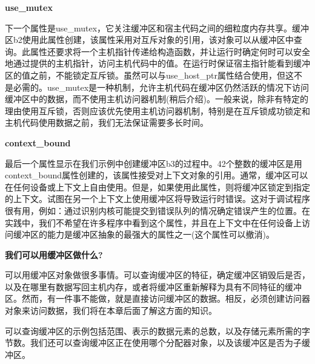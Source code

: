 \hspace*{\fill} \par %
\textbf{use\_mutex}

下一个属性是use\_mutex，它关注缓冲区和宿主代码之间的细粒度内存共享。缓冲区b2使用此属性创建，该属性采用对互斥对象的引用，该对象可以从缓冲区中查询。此属性还要求将一个主机指针传递给构造函数，并让运行时确定何时可以安全地通过提供的主机指针，访问主机代码中的值。在运行时保证宿主指针能看到缓冲区的值之前，不能锁定互斥锁。虽然可以与use\_host\_ptr属性结合使用，但这不是必需的。use\_mutex是一种机制，允许主机代码在缓冲区仍然活跃的情况下访问缓冲区中的数据，而不使用主机访问器机制(稍后介绍)。一般来说，除非有特定的理由使用互斥锁，否则应该优先使用主机访问器机制，特别是在互斥锁成功锁定和主机代码使用数据之前，我们无法保证需要多长时间。\par

\hspace*{\fill} \par %
\textbf{context\_bound}

最后一个属性显示在我们示例中创建缓冲区b3的过程中。42个整数的缓冲区是用context\_bound属性创建的，该属性接受对上下文对象的引用。通常，缓冲区可以在任何设备或上下文上自由使用。但是，如果使用此属性，则将缓冲区锁定到指定的上下文。试图在另一个上下文上使用缓冲区将导致运行时错误。这对于调试程序很有用，例如：通过识别内核可能提交到错误队列的情况确定错误产生的位置。在实践中，我们不希望在许多程序中看到这个属性，并且在上下文中在任何设备上访问缓冲区的能力是缓冲区抽象的最强大的属性之一(这个属性可以撤消)。\par

\hspace*{\fill} \par %
\textbf{我们可以用缓冲区做什么?}

可以用缓冲区对象做很多事情。可以查询缓冲区的特征，确定缓冲区销毁后是否，以及在哪里有数据写回主机内存，或者将缓冲区重新解释为具有不同特征的缓冲区。然而，有一件事不能做，就是直接访问缓冲区的数据。相反，必须创建访问器对象来访问数据，我们将在本章后面了解这方面的知识。\par

可以查询缓冲区的示例包括范围、表示的数据元素的总数，以及存储元素所需的字节数。我们还可以查询缓冲区正在使用哪个分配器对象，以及该缓冲区是否为子缓冲区。\par

